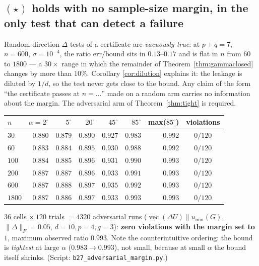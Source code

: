 \documentclass[11pt]{article}
\theoremstyle{remark}
\begin{document}
\subsection{$(\star)$ holds with no sample-size margin, in the only test that can
detect a failure}\label{sec:adversarial}

Random-direction $\Delta$ tests of a certificate are \emph{vacuously true}: at
$p+q=7$, $n=600$, $\sigma=10^{-4}$, the ratio $\text{err}/\text{bound}$ sits in
$0.13$--$0.17$ and is flat in $n$ from $60$ to $1800$ --- a $30\times$ range in which the
remainder of Theorem~\ref{thm:gammaclosed} changes by more than $10\%$. Corollary
\ref{cor:dilution} explains it: the leakage is diluted by $1/d$, so the test never gets
close to the bound. Any claim of the form ``the certificate passes at $n=\ldots$'' made
on a random arm carries no information about the margin. The adversarial arm of
Theorem~\ref{thm:tight} is required.

\begin{center}\begin{tabular}{lrrrrrrc}
\toprule $n$ & $\alpha=2^\circ$ & $5^\circ$ & $20^\circ$ & $45^\circ$ & $85^\circ$ &
max($85^\circ$) & violations\\
\midrule
$30$   & $0.880$ & $0.879$ & $0.890$ & $0.927$ & $0.983$ & $0.992$ & $0/120$\\
$60$   & $0.883$ & $0.884$ & $0.895$ & $0.930$ & $0.988$ & $0.992$ & $0/120$\\
$100$  & $0.884$ & $0.885$ & $0.896$ & $0.931$ & $0.990$ & $0.993$ & $0/120$\\
$200$  & $0.887$ & $0.887$ & $0.896$ & $0.933$ & $0.991$ & $0.993$ & $0/120$\\
$600$  & $0.887$ & $0.888$ & $0.897$ & $0.935$ & $0.992$ & $0.993$ & $0/120$\\
$1800$ & $0.887$ & $0.886$ & $0.897$ & $0.933$ & $0.993$ & $0.993$ & $0/120$\\
\bottomrule
\end{tabular}\end{center}

\noindent $36$ cells $\times\ 120$ trials $=4320$ adversarial runs
($\operatorname{vec}(\Delta U)\parallel u_{\min}(G)$, $\|\Delta\|_F=0.05$,
$d=10,p=4,q=3$): \textbf{zero violations with the margin set to $1$}, maximum observed
ratio $0.993$. Note the counterintuitive ordering: the bound is \emph{tightest} at large
$\alpha$ ($0.983\to0.993$), not small, because at small $\alpha$ the bound itself
shrinks. (Script: \texttt{b27\_adversarial\_margin.py}.)
\end{document}
